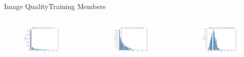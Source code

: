 \begin{frame}{Image Quality}{Training Members}
\vspace{-0.5cm}
\begin{columns}

    \begin{figure}
        \includegraphics[width=0.5 \textwidth]{figs/WhiteNoisedistred.pdf}
    \end{figure}
    \vspace{-0.5cm}
    \begin{figure}
        \includegraphics[width=0.5 \textwidth]{figs/GaussianBlurdistred.pdf}
    \end{figure}
    \vspace{-0.5cm}
    \begin{figure}
        \includegraphics[width=0.5 \textwidth]{figs/JPEGCompressiondistred.pdf}
    \end{figure}


\end{columns}
\end{frame}

